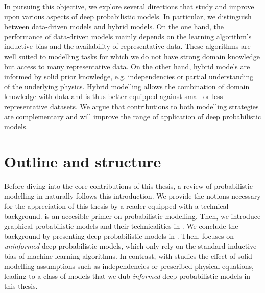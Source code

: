 In pursuing this objective, we explore several directions that study and improve upon various aspects of deep probabilistic models. In particular, we distinguish between data-driven models and hybrid models. On the one hand, the performance of data-driven models mainly depends on the learning algorithm's inductive bias and the availability of representative data. These algorithms are well suited to modelling tasks for which we do not have strong domain knowledge but access to many representative data. On the other hand, hybrid models are informed by solid prior knowledge, e.g. independencies or partial understanding of the underlying physics. Hybrid modelling allows the combination of domain knowledge with data and is thus better equipped against small or less-representative datasets. We argue that contributions to both modelling strategies are complementary and will improve the range of application of deep probabilistic models.





\section{Outline and structure}

Before diving into the core contributions of this thesis, a review of probabilistic modelling in  naturally follows this introduction. We provide the notions necessary for the appreciation of this thesis by a reader equipped with a technical background.   is an accesible primer on probabilistic modelling. Then, we introduce graphical probabilistic models and their technicalities in . We conclude the background by presenting deep probabilistic models in  . Then,  focuses on \textit{uninformed} deep probabilistic models, which only rely on the standard inductive bias of machine learning algorithms. In contrast, with  studies the effect of solid modelling assumptions such as independencies or prescribed physical equations, leading to a class of models that we dub \textit{informed} deep probabilistic models in this thesis.

